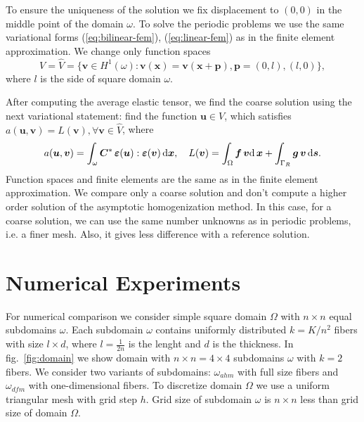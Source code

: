 \documentclass[a4paper]{jpconf}
\begin{document}
To ensure the uniqueness of the solution we fix displacement  to $(0, 0)$ in the middle point of the domain $\omega$. To solve the periodic problems we use the same variational forms (\ref{eq:bilinear-fem}), (\ref{eq:linear-fem}) as in the finite element approximation. We change only function spaces
\[
V = \widehat{V} = \{\bm{v} \in H^1(\omega): \bm{v}(\bm{x}) = \bm{v}(\bm{x} + \bm{p}), \bm{p} = (0, l), (l, 0) \},
\]
where $l$ is the side of square domain $\omega$.

After computing the average elastic tensor, we find the coarse solution using the next variational statement: find the function $\bm{u} \in V$, which satisfies $a(\bm{u}, \bm{v}) = L(\bm{v}), \forall \bm{v} \in \widehat{V}$, where
\[
a(\bm{u}, \bm{v}) = \int_\omega \bm{C}^* \, \bm{\varepsilon}(\bm{u}) : \bm{\varepsilon}(\bm{v})\, {\rm d}\bm{x}, \quad
L(\bm{v}) = \int_\Omega \bm{f}\, \bm{v} {\rm d}\, \bm{x} + \int_{\Gamma_R} \bm{g}\, \bm{v}\, {\rm d}\bm{s}.
\]
Function spaces and finite elements are the same as in the finite element approximation. We compare only a coarse solution and don't compute a higher order solution of the asymptotic homogenization method. In this case, for a coarse solution, we can use the same number unknowns as in periodic problems, i.e. a finer mesh. Also, it gives less difference with a reference solution.

\section{Numerical Experiments}

For numerical comparison we consider simple square domain $\Omega$ with $n \times n$ equal subdomains $\omega$. Each subdomain $\omega$ contains uniformly distributed $k=K/n^2$ fibers with size $l \times d$, where $l=\frac{1}{2n}$ is the lenght and $d$ is the thickness. In fig.~\ref{fig:domain} we show domain with $n \times n = 4 \times 4$ subdomains $\omega$ with $k=2$ fibers. We consider two variants of subdomains: $\omega_{ahm}$ with full size fibers and $\omega_{dfm}$ with one-dimensional fibers. To discretize domain $\Omega$ we use a uniform triangular mesh with grid step $h$. Grid size of subdomain $\omega$ is $n \times n$ less than grid size of domain $\Omega$.
\end{document}
